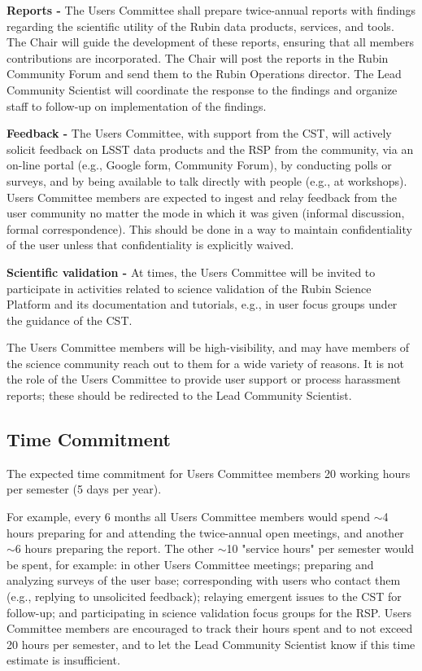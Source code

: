 \documentclass[OPS,toc]{lsstdoc}
\begin{document}
\textbf{Reports -}
The Users Committee shall prepare twice-annual reports with findings regarding the scientific utility of the Rubin data products, services, and tools.
The Chair will guide the development of these reports, ensuring that all members contributions are incorporated.
The Chair will post the reports in the Rubin Community Forum and send them to the Rubin Operations director.
The Lead Community Scientist will coordinate the response to the findings and organize staff to follow-up on implementation of the findings.

\textbf{Feedback -}
The Users Committee, with support from the CST, will actively solicit feedback on LSST data products and the RSP from the community, via an on-line portal (e.g., Google form, Community Forum), by conducting polls or surveys, and by being available to talk directly with people (e.g., at workshops).
Users Committee members are expected to ingest and relay feedback from the user community no matter the mode in which it was given (informal discussion, formal correspondence).
This should be done in a way to maintain confidentiality of the user unless that confidentiality is explicitly waived.

\textbf{Scientific validation -}
At times, the Users Committee will be invited to participate in activities related to science validation of the Rubin Science Platform and its documentation and tutorials, e.g., in user focus groups under the guidance of the CST.

The Users Committee members will be high-visibility, and may have members of the
science community reach out to them for a wide variety of reasons.
It is not the role of the Users Committee to provide user support or process harassment reports;
these should be redirected to the Lead Community Scientist.


\subsection{Time Commitment}

The expected time commitment for Users Committee members 20 working hours per semester (5 days per year).

For example, every 6 months all Users Committee members would spend $\sim$4 hours preparing for and attending the twice-annual open meetings, and another $\sim$6 hours preparing the report.
The other $\sim$10 "service hours" per semester would be spent, for example: in other Users Committee meetings; preparing and analyzing surveys of the user base; corresponding with users who contact them (e.g., replying to unsolicited feedback); relaying emergent issues to the CST for follow-up; and participating in science validation focus groups for the RSP. 
Users Committee members are encouraged to track their hours spent and to not exceed 20 hours per semester, and to let the Lead Community Scientist know if this time estimate is insufficient. 
\end{document}
